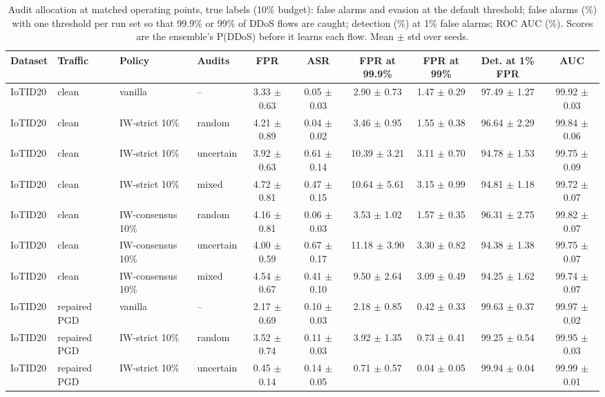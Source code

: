 \begin{table}[t]
\centering
\caption{Audit allocation at matched operating points, true labels (10\% budget): false alarms and evasion at the default threshold; false alarms (\%) with one threshold per run set so that 99.9\% or 99\% of DDoS flows are caught; detection (\%) at 1\% false alarms; ROC AUC (\%). Scores are the ensemble's P(DDoS) before it learns each flow. Mean $\pm$ std over seeds.}
\label{tab:oppoint}
\footnotesize
\setlength{\tabcolsep}{3pt}
\begin{tabular}{llllcccccc}
\toprule
Dataset & Traffic & Policy & Audits & FPR & ASR & FPR at 99.9\% & FPR at 99\% & Det. at 1\% FPR & AUC \\
\midrule
IoTID20 & clean & vanilla & -- & 3.33 $\pm$ 0.63 & 0.05 $\pm$ 0.03 & 2.90 $\pm$ 0.73 & 1.47 $\pm$ 0.29 & 97.49 $\pm$ 1.27 & 99.92 $\pm$ 0.03 \\
IoTID20 & clean & IW-strict 10\% & random & 4.21 $\pm$ 0.89 & 0.04 $\pm$ 0.02 & 3.46 $\pm$ 0.95 & 1.55 $\pm$ 0.38 & 96.64 $\pm$ 2.29 & 99.84 $\pm$ 0.06 \\
IoTID20 & clean & IW-strict 10\% & uncertain & 3.92 $\pm$ 0.63 & 0.61 $\pm$ 0.14 & 10.39 $\pm$ 3.21 & 3.11 $\pm$ 0.70 & 94.78 $\pm$ 1.53 & 99.75 $\pm$ 0.09 \\
IoTID20 & clean & IW-strict 10\% & mixed & 4.72 $\pm$ 0.81 & 0.47 $\pm$ 0.15 & 10.64 $\pm$ 5.61 & 3.15 $\pm$ 0.99 & 94.81 $\pm$ 1.18 & 99.72 $\pm$ 0.07 \\
IoTID20 & clean & IW-consensus 10\% & random & 4.16 $\pm$ 0.81 & 0.06 $\pm$ 0.03 & 3.53 $\pm$ 1.02 & 1.57 $\pm$ 0.35 & 96.31 $\pm$ 2.75 & 99.82 $\pm$ 0.07 \\
IoTID20 & clean & IW-consensus 10\% & uncertain & 4.00 $\pm$ 0.59 & 0.67 $\pm$ 0.17 & 11.18 $\pm$ 3.90 & 3.30 $\pm$ 0.82 & 94.38 $\pm$ 1.38 & 99.75 $\pm$ 0.07 \\
IoTID20 & clean & IW-consensus 10\% & mixed & 4.54 $\pm$ 0.67 & 0.41 $\pm$ 0.10 & 9.50 $\pm$ 2.64 & 3.09 $\pm$ 0.49 & 94.25 $\pm$ 1.62 & 99.74 $\pm$ 0.07 \\
IoTID20 & repaired PGD & vanilla & -- & 2.17 $\pm$ 0.69 & 0.10 $\pm$ 0.03 & 2.18 $\pm$ 0.85 & 0.42 $\pm$ 0.33 & 99.63 $\pm$ 0.37 & 99.97 $\pm$ 0.02 \\
IoTID20 & repaired PGD & IW-strict 10\% & random & 3.52 $\pm$ 0.74 & 0.11 $\pm$ 0.03 & 3.92 $\pm$ 1.35 & 0.73 $\pm$ 0.41 & 99.25 $\pm$ 0.54 & 99.95 $\pm$ 0.03 \\
IoTID20 & repaired PGD & IW-strict 10\% & uncertain & 0.45 $\pm$ 0.14 & 0.14 $\pm$ 0.05 & 0.71 $\pm$ 0.57 & 0.04 $\pm$ 0.05 & 99.94 $\pm$ 0.04 & 99.99 $\pm$ 0.01 \\

\end{tabular}
\end{table}
